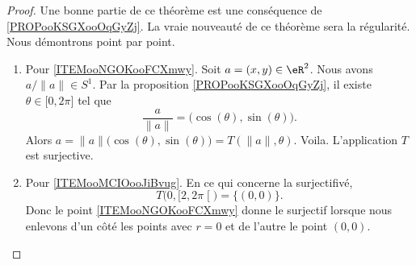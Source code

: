 \begin{proof}
    Une bonne partie de ce théorème est une conséquence de \ref{PROPooKSGXooOqGyZj}. La vraie nouveauté de ce théorème sera la régularité.  Nous démontrons point par point.
    \begin{enumerate}
        \item
            Pour \ref{ITEMooNGOKooFCXmwy}. Soit \( a=(x,y)\in \eR^2\). Nous avons \( a/\| a \|\in S^1\). Par la proposition \ref{PROPooKSGXooOqGyZj}, il existe \( \theta\in \mathopen[ 0 , 2\pi \mathclose]\) tel que
            \begin{equation}
                \frac{ a }{ \| a \| }=\big( \cos(\theta),\sin(\theta) \big).
            \end{equation}
            Alors \( a=  \| a \|\big( \cos(\theta),\sin(\theta) \big)= T(\| a \|,\theta)\). Voila. L'application \( T\) est surjective.
        \item
            Pour \ref{ITEMooMCIOooJiBvug}. En ce qui concerne la surjectifivé,
            \begin{equation}
                T\big( 0,\mathopen[ 2 , 2\pi \mathclose[ \big)=\{ (0,0) \}.
            \end{equation}
            Donc le point \ref{ITEMooNGOKooFCXmwy} donne le surjectif lorsque nous enlevons d'un côté les points avec \( r=0\) et de l'autre le point \( (0,0)\). 
            

\end{enumerate}
\end{proof}
